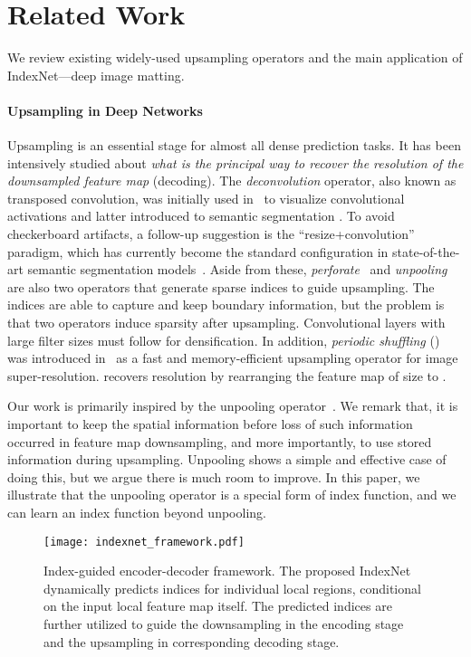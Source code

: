 \documentclass[10pt,twocolumn,letterpaper]{article}
\begin{document}
\section{Related Work}

We review existing widely-used upsampling operators and the main application of IndexNet---deep image matting.

\paragraph{Upsampling in Deep Networks}
Upsampling is an essential stage for almost all dense prediction tasks.
It has been intensively studied about \textit{what is the principal way to recover the resolution of the downsampled feature map} (decoding). The \textit{deconvolution} operator, also known as transposed convolution, was initially used  in~\cite{zeiler2014visualizing} to visualize convolutional activations and latter introduced to semantic segmentation \cite{long2015fully}.
To avoid checkerboard artifacts, a follow-up suggestion is the ``resize+convolution'' paradigm, which has currently become the standard configuration in state-of-the-art semantic segmentation models~\cite{chen18v3,lin2017refine}. Aside from these, \textit{perforate}~\cite{osendorfer2014image} and \textit{unpooling}~\cite{badrinarayanan2017segnet} are also two operators that generate sparse indices to guide upsampling. The indices are able to capture and keep boundary information, but the problem is that two operators induce sparsity after upsampling. Convolutional layers with large filter sizes must follow for densification. In addition, \textit{periodic shuffling} () was introduced in~\cite{shi2016real} as a fast and memory-efficient upsampling  operator for image super-resolution.  recovers resolution by rearranging the feature map of size  to .

Our work is primarily inspired by the unpooling operator~\cite{badrinarayanan2017segnet}. We remark that, it is important to keep  the spatial information before loss of such information occurred in feature map downsampling, and more importantly, to use stored information during upsampling. Unpooling shows a simple and effective case of doing this, but we argue there is much room to improve. In this paper, we illustrate that the unpooling operator is a special form of index function, and we can learn an index function beyond unpooling.

\begin{figure*}[!tb]
	\captionsetup{font=small,singlelinecheck=true}
	\setlength{\abovecaptionskip}{10pt}
	\centering
	\texttt{[image: indexnet\_framework.pdf]}
\caption{Index-guided encoder-decoder framework. The proposed \mbox{IndexNet} dynamically predicts indices for individual local regions, conditional on the input local feature map itself. The predicted indices are further utilized to guide the downsampling in the encoding stage and the upsampling in corresponding decoding stage.}
	\label{fig:framework}
\end{figure*}
\end{document}
